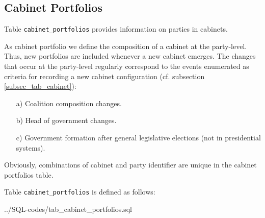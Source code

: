 \subsection{Cabinet Portfolios}\label{subsec_tab_cabinet_portfolios}
Table \texttt{\footnotesize cabinet\_portfolios} provides information on parties in cabinets. 

As cabinet portfolio we define the composition of a cabinet at the party-level.
Thus, new portfolios are included whenever a new cabinet emerges.
The changes that occur at the party-level regularly correspond to the events enumerated as criteria for recording a new cabinet configuration (cf. subsection \ref{subsec_tab_cabinet}):
\begin{itemize}%
\item[a)] Coalition composition changes.
\item[b)] Head of government changes.
\item[c)] Government formation after general legislative elections (not in presidential systems).
\end{itemize}
Obviously, combinations of cabinet and party identifier are unique in the cabinet portfolios table.

Table \texttt{\footnotesize cabinet\_portfolios} is defined as follows:

%
{../SQL-codes/tab_cabinet_portfolios.sql}
